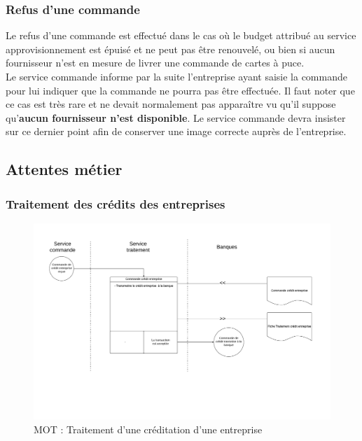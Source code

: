 \subsubsection{Refus d'une commande}

Le refus d'une commande est effectué dans le cas où le budget attribué au
service approvisionnement est épuisé et ne peut pas être renouvelé, ou bien si
aucun fournisseur n'est en mesure de livrer une commande de cartes à puce. \\

Le service commande informe par la suite l'entreprise ayant saisie la commande
pour lui indiquer que la commande ne pourra pas être effectuée. Il faut noter
que ce cas est très rare et ne devait normalement pas apparaître vu qu'il
suppose qu'\textbf{aucun fournisseur n'est disponible}. Le service commande
devra insister sur ce dernier point afin de conserver une image correcte auprès
de l'entreprise.

\subsection{Attentes métier}
\subsubsection{Traitement des crédits des entreprises}
\begin{landscape}
  \begin{figure}[ht!]
      \centering
      \includegraphics[width=0.7\paperheight]{mot-traitement-credit-entreprise}
      \caption{MOT : Traitement d'une créditation d'une entreprise}
      \label{fig:mot-traitement-credit-entreprise}
  \end{figure}
\end{landscape}


